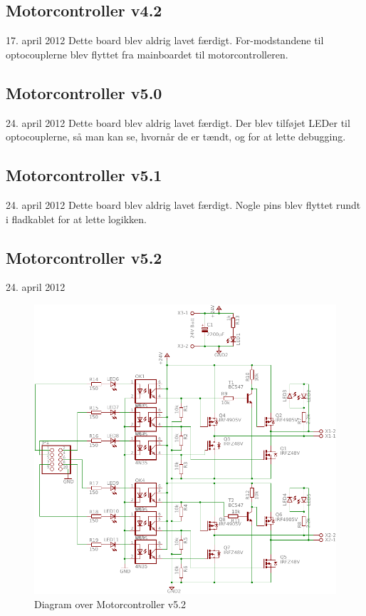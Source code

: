 \documentclass[a4paper,oneside,article,danish,table]{memoir}
\newcommand{\boarddate}[1]{\textcolor{blue!80!black}{#1}}
\begin{document}
\subsection{Motorcontroller v4.2}
\boarddate{17. april 2012} Dette board blev aldrig lavet færdigt.
For-modstandene til optocouplerne blev flyttet fra mainboardet til motorcontrolleren.

\subsection{Motorcontroller v5.0}
\boarddate{24. april 2012} Dette board blev aldrig lavet færdigt.
Der blev tilføjet LEDer til optocouplerne, så man kan se, hvornår de er tændt, og for at lette debugging.  

\subsection{Motorcontroller v5.1}
\boarddate{24. april 2012} Dette board blev aldrig lavet færdigt.
Nogle pins blev flyttet rundt i fladkablet for at lette logikken. 

\subsection{Motorcontroller v5.2}
\boarddate{24. april 2012}
\begin{figure}[htbp]
  \centering
  \includegraphics[width=\textwidth]{pictures/MotorcontrollerSch5-2.pdf}
  \caption{Diagram over Motorcontroller v5.2}
  \label{fig:mosch5.2}
\end{figure}
\end{document}

